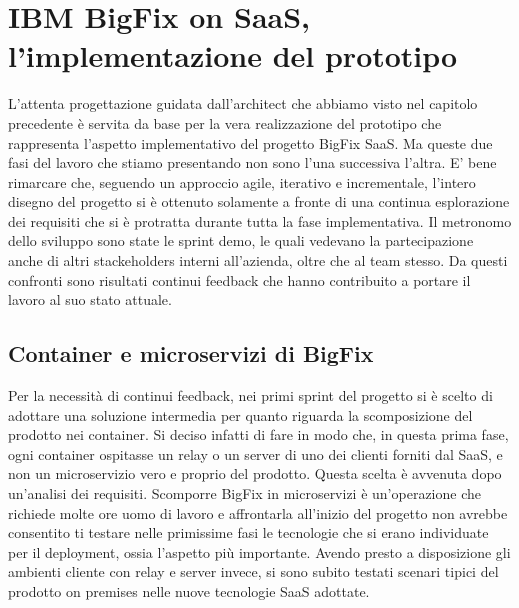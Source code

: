 \chapter{IBM BigFix on SaaS, l'implementazione del prototipo}
L'attenta progettazione guidata dall'architect che abbiamo visto nel capitolo precedente è servita da base per la vera realizzazione del prototipo che rappresenta l'aspetto implementativo del progetto BigFix SaaS. Ma queste due fasi del lavoro che stiamo presentando non sono l'una successiva l'altra. E' bene rimarcare che, seguendo un approccio agile, iterativo e incrementale, l'intero disegno del progetto si è ottenuto solamente a fronte di una continua esplorazione dei requisiti che si è protratta durante tutta la fase implementativa. Il metronomo dello sviluppo sono state le sprint demo, le quali vedevano la partecipazione anche di altri stackeholders interni all'azienda, oltre che al team stesso. Da questi confronti sono risultati continui feedback che hanno contribuito a portare il lavoro al suo stato attuale.

\section{Container e microservizi di BigFix}
Per la necessità di continui feedback, nei primi sprint del progetto si è scelto di adottare una soluzione intermedia per quanto riguarda la scomposizione del prodotto nei container. Si deciso infatti di fare in modo che, in questa prima fase, ogni container ospitasse un relay o un server di uno dei clienti forniti dal SaaS, e non un microservizio vero e proprio del prodotto. Questa scelta è avvenuta dopo un'analisi dei requisiti. Scomporre BigFix in microservizi è un'operazione che richiede molte ore uomo di lavoro e affrontarla all'inizio del progetto non avrebbe consentito ti testare nelle primissime fasi le tecnologie che si erano individuate per il deployment, ossia l'aspetto più importante. Avendo presto a disposizione gli ambienti cliente con relay e server invece, si sono subito testati scenari tipici del prodotto on premises nelle nuove tecnologie SaaS adottate.

